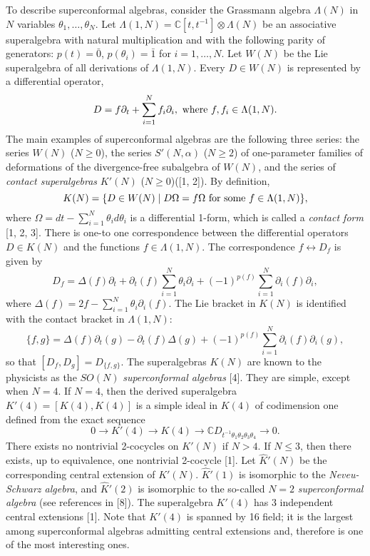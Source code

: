 \documentclass[a4paper,a4paper]{article}
\begin{document}
To describe superconformal algebras, consider
the Grassmann algebra $\Lambda(N)$ in $N$ variables
$\theta_1, \ldots, \theta_N$. Let
$\Lambda(1, N) =\mathbb C [t, t^{-1}]\otimes \Lambda (N)$ be an associative
superalgebra with natural multiplication and with the following parity 
of generators: $p(t) = \bar{0}$, $p(\theta_i) = \bar{1}$
for $i = 1, \ldots, N$. Let
$W(N)$ be the Lie superalgebra of all derivations of
$\Lambda(1, N)$.
Every $D\in W(N)$ is represented by a differential operator,
\begin{equation}
D = f\partial_t + \sum_{i=1}^N f_i \partial_i, \hbox{ where }
f, f_i \in  \Lambda(1, N).
\end{equation}
The main examples  of superconformal algebras are the following three series:
the series $W(N)$ ($N\geq 0$), the series $S'(N, \alpha)$ ($N\geq 2$)
of one-parameter families
of deformations of the divergence-free subalgebra of $W(N)$,
and the series of {\it contact superalgebras} $K'(N)$ ($N\geq 0$)([1, 2]).
By definition,
\begin{equation}
K(N) = \lbrace D \in W(N)\mid D\Omega  = f\Omega \hbox{ for some }
f\in \Lambda(1, N)\rbrace, 
\end{equation}
where
$\Omega = dt - \sum_{i=1}^N \theta_id\theta_i$
is a differential 1-form, which is called a {\it contact form} [1, 2, 3].
There is one-to one correspondence between the differential operators
$D\in K(N)$ and the functions $f \in \Lambda(1, N)$.
The correspondence $f \leftrightarrow D_f$ is given by
\begin{equation}
D_f = \Delta(f)\partial_t + \partial_t(f)\sum_{i=1}^N \theta_i\partial_i
+ (-1)^{p(f)}\sum_{i=1}^N\partial_i(f)\partial_i,
\end{equation}
where $\Delta(f) = 2f - \sum_{i=1}^N\theta_i\partial_i(f)$.
The Lie bracket in $K(N)$ is identified with the contact bracket in 
$\Lambda(1, N)$:
\begin{equation}
\lbrace f, g\rbrace = \Delta(f)\partial_t(g) - \partial_t(f)\Delta(g)
+ (-1)^{p(f)}\sum_{i=1}^N\partial_i(f)\partial_i(g), 
\end{equation}
so that $[D_f, D_g] = D_{\lbrace f, g \rbrace}$.
The superalgebras $K(N)$ are known to the physicists as
the $SO(N)$ {\it superconformal algebras} [4]. They are
simple, except when $N = 4$. If $N = 4$,
then the derived superalgebra $K'(4) = [K(4), K(4)]$ is a simple ideal in
$K(4)$ of codimension one defined from the exact sequence
\begin{equation}
0\rightarrow K'(4)\rightarrow K(4)\rightarrow \mathbb C 
D_{t^{-1} \theta_1\theta_2\theta_3\theta_4}\rightarrow 0.
\end{equation}
There exists no nontrivial 2-cocycles on $K'(N)$ if $N > 4$.
If $N \leq 3$, then there exists, up to equivalence,
one nontrivial 2-cocycle [1]. Let $\hat{K}'(N)$ be the corresponding central 
extension of ${K}'(N)$. 
$\hat{K}'(1)$ is isomorphic to the  {\it Neveu-Schwarz algebra},
and $\hat{K}'(2)$ is isomorphic to the so-called 
$N = 2$  {\it superconformal algebra} (see references in [8]).
The superalgebra $K'(4)$ has 3 independent central extensions [1].
Note that $K'(4)$ is spanned by 16 field; it is the largest 
among superconformal algebras admitting central extensions and, 
therefore is one of the most interesting ones.
\end{document}
